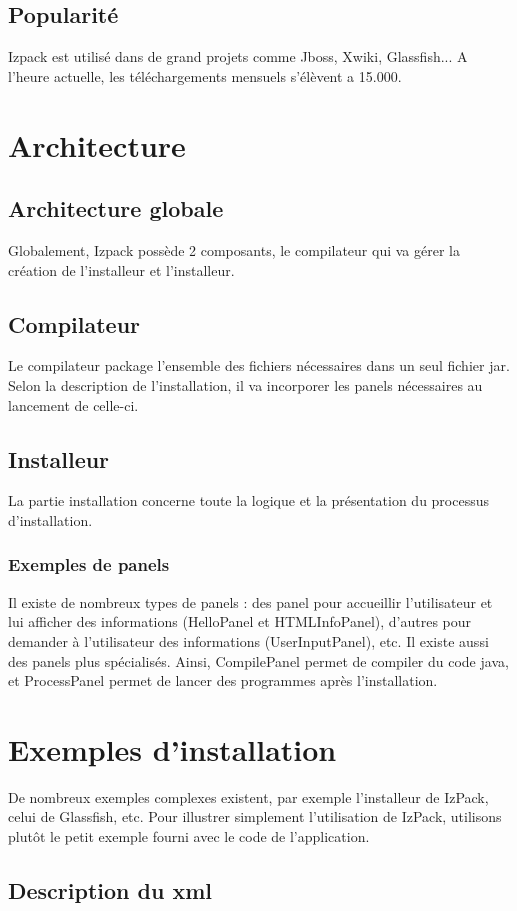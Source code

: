 \subsection{Popularité}
Izpack est utilisé dans de grand projets comme Jboss, Xwiki, Glassfish... A l'heure actuelle, les téléchargements mensuels s'élèvent a 15.000.
\section{Architecture}
\subsection{Architecture globale}
Globalement, Izpack possède 2 composants, le compilateur qui va gérer la création de l'installeur et l'installeur.
\subsection{Compilateur}
Le compilateur package l'ensemble des fichiers nécessaires dans un seul fichier jar. Selon la description de l'installation, il va incorporer les panels nécessaires au lancement de celle-ci. 
\subsection{Installeur}
La partie installation concerne toute la logique et la présentation du processus d'installation. 
\subsubsection{Exemples de panels}
Il existe de nombreux types de panels : des panel pour accueillir l'utilisateur et lui afficher des informations (HelloPanel et HTMLInfoPanel), d'autres pour demander à l'utilisateur des informations (UserInputPanel), etc.
Il existe aussi des panels plus spécialisés. Ainsi, CompilePanel permet de compiler du code java, et ProcessPanel permet de lancer des programmes après l'installation.

\section{Exemples d'installation}
De nombreux exemples complexes existent, par exemple l'installeur de IzPack, celui de Glassfish, etc. Pour illustrer simplement l'utilisation de IzPack, utilisons plutôt le petit exemple fourni avec le code de l'application.

\subsection{Description du xml}

